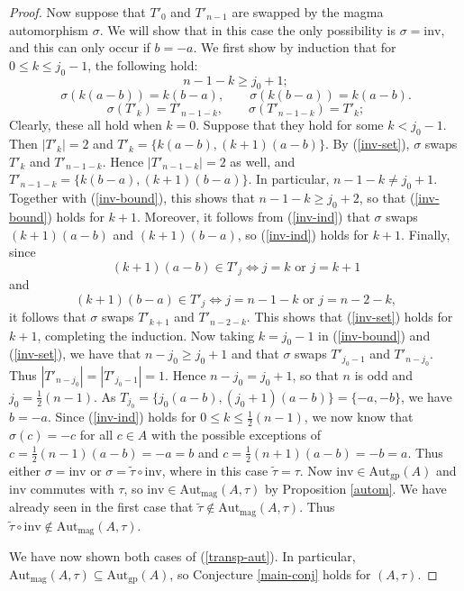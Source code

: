 \documentclass[letterpaper,12pt]{amsart}
\numberwithin{equation}{section}
\numberwithin{algorithm}{section}
\theoremstyle{definition}
\newcommand{\LRA}{\Leftrightarrow}
\newcommand{\inv}{\mathrm{inv}}
\newcommand{\Autgp}{\mathrm{Aut}_{\mathrm{gp}}}
\newcommand{\Autmag}{\mathrm{Aut}_\mathrm{mag}}
\newcommand{\ttau}{\tilde{\tau}}
\begin{document}
\begin{proof}
Now suppose that $T'_0$ and $T'_{n-1}$ are swapped by the magma automorphism $\sigma$. We will show that in this case the only possibility is $\sigma =\inv$, and this can only occur if $b=-a$. 
We first show by induction that for $0 \leq k \leq j_0-1$, the following hold:
\begin{equation} \label{inv-bound}
	n-1-k \geq j_0+1; 
\end{equation}
\begin{equation} \label{inv-ind}
	\sigma(k(a-b))=k(b-a), \qquad  	\sigma(k(b-a))=k(a-b).
\end{equation}
\begin{equation} \label{inv-set}
	\sigma(T'_k) = T'_{n-1-k}, \qquad \sigma(T'_{n-1-k})=T'_k; 
\end{equation}
Clearly, these all hold when $k=0$. Suppose that they hold for some $k < j_0-1$. Then $|T'_k|=2$ and $T'_k=\{k(a-b), (k+1)(a-b)\}$. By (\ref{inv-set}), $\sigma$ swaps $T'_k$ and $T'_{n-1-k}$. Hence $|T'_{n-1-k}|=2$ as well, and $T'_{n-1-k}=\{k(b-a),(k+1)(b-a)\}$. In particular, $n-1-k \neq j_0+1$. Together with (\ref{inv-bound}), this shows that $n-1-k \geq j_0+2$, so that (\ref{inv-bound}) holds for $k+1$. Moreover, it follows from (\ref{inv-ind}) that $\sigma$ swaps $(k+1)(a-b)$ and $(k+1)(b-a)$, so (\ref{inv-ind}) holds for $k+1$. Finally, since 
$$  (k+1)(a-b) \in T'_j \LRA j=k \mbox{ or } j=k+1 $$
and
$$  (k+1)(b-a) \in T'_j \LRA j=n-1-k \mbox{ or } j= n-2-k, $$
it follows that $\sigma$ swaps $T'_{k+1}$ and $T'_{n-2-k}$. This shows that (\ref{inv-set}) holds for $k+1$, completing the induction. Now taking $k=j_0-1$ in (\ref{inv-bound}) and (\ref{inv-set}), we have that $n-j_0 \geq j_0+1$ and that $\sigma$ swaps $T'_{j_0-1}$ and $T'_{n-j_0}$. Thus $|T'_{n-j_0}|=|T'_{j_0-1}|=1$. Hence $n-j_0=j_0+1$, so that $n$ is odd and $j_0=\frac{1}{2}(n-1)$. As $T_{j_0}=\{j_0(a-b), (j_0+1)(a-b)\}=\{-a,-b\}$, we have $b=-a$. Since (\ref{inv-ind}) holds for $0 \leq k \leq \frac{1}{2}(n-1)$, we now know that $\sigma(c)=-c$ for all $c \in A$ with the possible exceptions of $c=\frac{1}{2}(n-1)(a-b)=-a=b$ and $c=\frac{1}{2}(n+1)(a-b)=-b=a$. Thus either $\sigma=\inv$ or $\sigma=\ttau \circ \inv$, where in this case $\ttau=\tau$. Now $\inv \in \Autgp(A)$ and $\inv$ commutes with $\tau$, so $\inv \in \Autmag(A,\tau)$ by Proposition \ref{autom}. We have already seen in the first case that $\ttau \not \in \Autmag(A,\tau)$. Thus $\ttau \circ \inv \not \in \Autmag(A,\tau)$. 

We have now shown both cases of (\ref{transp-aut}). In particular, $\Autmag(A,\tau) \subseteq \Autgp(A)$, so Conjecture \ref{main-conj} holds for $(A, \tau)$. 
\end{proof}
\end{document}
